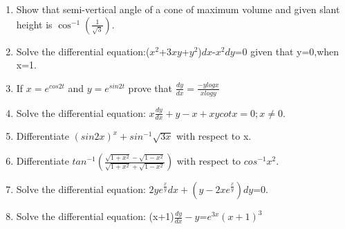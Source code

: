 \begin{enumerate}
    \item Show that semi-vertical angle of a cone of maximum volume and given slant height is $\cos^{-1}(\frac{1}{\sqrt{3}})$.
    \item Solve the differential equation:($x^{2}$+3$xy$+$y^{2}$)$dx$-$x^{2}$$dy$=0 given that y=0,when x=1.
    \item If  $ x=e^{cos2t}$ and $ y=e^{sin2t}$ prove that $\frac{dy}{dx} = \frac{-y logx}{x logy} $
    \item Solve the differential equation: $x\frac{dy}{dx}+y-x+xycotx=0; x\neq 0$.
    \item Differentiate $ (sin2x)^{x} + sin^{-1}\sqrt{3x}$ with respect to x.\\
    \item Differentiate $ tan^{-1} (\frac {\sqrt{1+x^2}-\sqrt{1-x^2}}{\sqrt{1+x^2}+\sqrt{1-x^2}})$ with respect to $cos^{-1}x^{2}$.
    \item Solve the differential equation: $ 2ye^\frac{x}{y}dx + (y-2xe^\frac{x}{y})dy$=0.
    \item  Solve the differential equation: (x+1)$\frac{dy}{dx}-y$=$e^{3x}(x+1)^3$

\end{enumerate}
